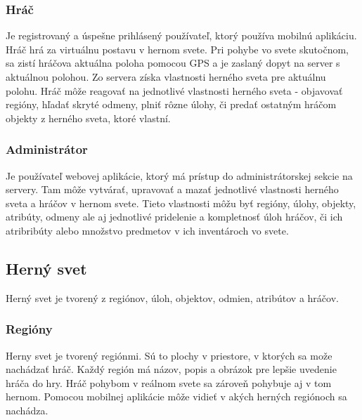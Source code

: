 \subsubsection{Hráč}
Je registrovaný a úspešne prihlásený používateľ, ktorý používa mobilnú aplikáciu. Hráč hrá za virtuálnu postavu v hernom svete. Pri pohybe vo svete skutočnom, sa zistí hráčova aktuálna poloha pomocou GPS a je zaslaný dopyt na server s aktuálnou polohou. Zo servera získa vlastnosti herného sveta pre aktuálnu polohu. Hráč môže reagovať na jednotlivé vlastnosti herného sveta - objavovať regióny, hľadať skryté odmeny, plniť rôzne úlohy, či predať ostatným hráčom objekty z herného sveta, ktoré vlastní.

\subsubsection{Administrátor}
Je používateľ webovej aplikácie, ktorý má prístup do administrátorskej sekcie na servery. Tam môže vytvárať, upravovať a mazať jednotlivé vlastnosti herného sveta a hráčov v hernom svete. Tieto vlastnosti môžu byť regióny, úlohy, objekty, atribúty, odmeny ale aj jednotlivé pridelenie a kompletnosť úloh hráčov, či ich atribribúty alebo množstvo predmetov v ich inventároch   vo svete. 

\subsection{Herný svet}
Herný svet je tvorený z regiónov, úloh, objektov, odmien, atribútov a hráčov.

\subsubsection{Regióny}
Herny svet je tvorený regiónmi. Sú to plochy v priestore, v ktorých sa može nachádzať hráč. Každý región má názov, popis a obrázok pre lepšie uvedenie hráča do hry. Hráč pohybom v reálnom svete sa zároveň pohybuje aj v tom hernom. Pomocou mobilnej aplikácie môže vidieť v akých herných regiónoch sa nachádza.

